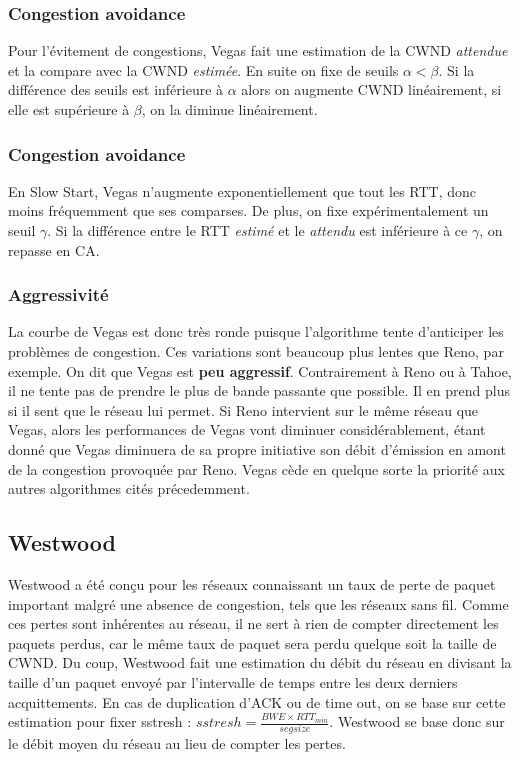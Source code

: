 \documentclass[	DIV=calc,%
							paper=a4,%
							fontsize=11pt,%
							twocolumn]{scrartcl}	 					%
\begin{document}
\subsubsection*{Congestion avoidance}
Pour l'évitement de congestions, Vegas fait une estimation de la CWND \textit{attendue} et la compare avec la CWND \textit{estimée}. En suite on fixe de seuils $\alpha<\beta$. Si la différence des seuils est inférieure à $\alpha$ alors on augmente CWND linéairement, si elle est supérieure à $ \beta $, on la diminue linéairement.
\subsubsection*{Congestion avoidance}
En Slow Start, Vegas n'augmente exponentiellement que tout les RTT, donc moins fréquemment que ses comparses. De plus, on fixe expérimentalement un seuil $\gamma$. Si la différence entre le RTT \textit{estimé} et le \textit{attendu} est inférieure à ce $\gamma$, on repasse en CA.
\subsubsection*{Aggressivité}
La courbe de Vegas est donc très ronde puisque l'algorithme tente d'anticiper les problèmes de congestion. Ces variations sont beaucoup plus lentes que Reno, par exemple. On dit que Vegas est \textbf{peu aggressif}. Contrairement à Reno ou à Tahoe, il ne tente pas de prendre le plus de bande passante que possible. Il en prend plus si il sent que le réseau lui permet. Si Reno intervient sur le même réseau que Vegas, alors les performances de Vegas vont diminuer considérablement, étant donné que Vegas diminuera de sa propre initiative son débit d'émission en amont de la congestion provoquée par Reno. Vegas cède en quelque sorte la priorité aux autres algorithmes cités précedemment.

\subsection*{Westwood}
Westwood a été conçu pour les réseaux connaissant un taux de perte de paquet important malgré une absence de congestion, tels que les réseaux sans fil. Comme ces pertes sont inhérentes au réseau, il ne sert à rien de compter directement les paquets perdus, car le même taux de paquet sera perdu quelque soit la taille de CWND. Du coup, Westwood fait une estimation du débit du réseau en divisant la taille d'un paquet envoyé par l'intervalle de temps entre les deux derniers acquittements. En cas de duplication d'ACK ou de time out, on se base sur cette estimation pour fixer sstresh : $sstresh=\frac{BWE \times RTT_{min}}{segsize} $. Westwood se base donc sur le débit moyen du réseau au lieu de compter les pertes.
\end{document}
